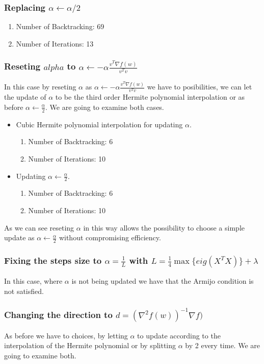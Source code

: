 \documentclass[11pt]{article}
\theoremstyle{plain}
\begin{document}
\subsubsection{Replacing $\alpha\leftarrow\alpha/2$}
\begin{enumerate}
\item Number of Backtracking: 69
\item Number of Iterations: 13
\end{enumerate}

\subsubsection{Reseting $alpha$ to $\alpha\leftarrow -\alpha\frac{v^{T}\nabla f(w)}{v^{T}v}$}
In this case by reseting $\alpha$ as $\alpha\leftarrow -\alpha\frac{v^{T}\nabla f(w)}{v^{T}v}$ we
have to posibilities, we can let the update of $\alpha$ to be the third order Hermite polynomial
interpolation or as before $\alpha\leftarrow\frac{\alpha}{2}$. We are going to examine both cases.

\begin{itemize}
\item Cubic Hermite polynomial interpolation for updating $\alpha$.
	\begin{enumerate}
	\item Number of Backtracking: 6
	\item Number of Iterations: 10
	\end{enumerate}

\item Updating $\alpha\leftarrow\frac{\alpha}{2}$.
	\begin{enumerate}
	\item Number of Backtracking: 6
	\item Number of Iterations: 10
	\end{enumerate}
\end{itemize} 
As we can see reseting $\alpha$ in this way allows the possibility to choose a simple update as
$\alpha\leftarrow\frac{\alpha}{2}$ without compromising efficiency.

\subsubsection{Fixing the steps size to $\alpha=\frac{1}{L}$ with $L=\frac{1}{4}\max\{eig(X^{T}X)\}+\lambda$}
In this case, where $\alpha$ is not being updated we have that the Armijo condition is not satisfied.


\subsubsection{Changing the direction to $d=(\nabla^{2} f(w))^{-1}\nabla{f})$}
As before we have to choices, by letting $\alpha$ to update according to the interpolation
of the Hermite polynomial or by splitting $\alpha$ by 2 every time. We are going to examine both.
\end{document}
